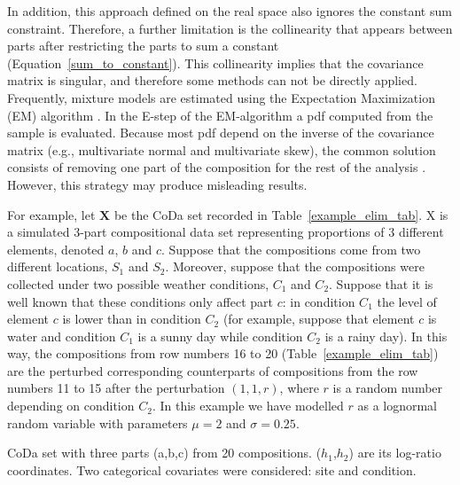\documentclass[12pt, a4paper]{article}
\begin{document}
In addition, this approach defined on the real space also ignores the constant sum constraint. Therefore, a further limitation is the collinearity that appears between parts  after restricting the parts to sum a constant (Equation~\ref{sum_to_constant}). This collinearity implies that the covariance matrix is singular, and therefore some methods can not be directly applied. Frequently, mixture models are estimated using the Expectation Maximization (EM) algorithm \citep{dempster1977maximum}. In the E-step of the EM-algorithm a pdf computed from the sample is evaluated. Because most pdf depend on the inverse of the covariance matrix (e.g., multivariate normal and multivariate skew), the common solution consists of removing one part of the composition for the rest of the analysis \citep{papageorgiou2001model}. However, this strategy may  produce misleading results.   

For example, let $\mathbf{X}$ be the CoDa set recorded in Table~\ref{example_elim_tab}. X is a simulated $3$-part compositional data set representing proportions of $3$ different elements, denoted $a$, $b$ and $c$. Suppose that the  compositions come from two different locations, $S_1$ and $S_2$. Moreover, suppose that the compositions were collected under two possible weather conditions, $C_1$ and $C_2$. Suppose that it is well known
that these conditions only affect part $c$: in condition $C_1$ the level of element $c$ is lower than in condition $C_2$ (for example, suppose that element $c$ is water and condition $C_1$ is a sunny day while condition $C_2$ is a rainy day). In this way, the compositions from row numbers 16 to 20 (Table~\ref{example_elim_tab}) are the perturbed corresponding counterparts of compositions from the
row numbers 11 to 15 after the perturbation $(1,1,r)$, where $r$ is a random number depending on condition $C_2$. In this example we have modelled $r$ as a lognormal random variable with parameters $\mu=2$ and $\sigma=0.25$. 
\begin{table}[htpb]
\centering
\scriptsize

\caption{CoDa set with three parts (a,b,c) from 20 compositions. ($h_1$,$h_2$) are its log-ratio coordinates.
Two categorical covariates were considered: site and condition. }
\label{example_elim_tab}
\end{table}
\end{document}
